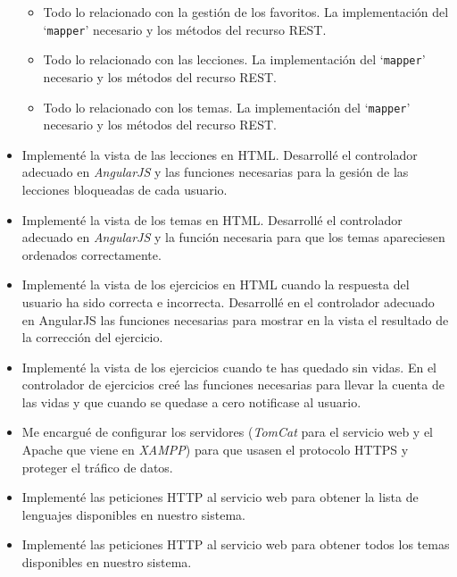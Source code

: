 \begin{itemize}
\begin{itemize}
\item
Todo lo relacionado con la gestión de los favoritos. La implementación del `\texttt{mapper}' necesario y los métodos del recurso REST.

\item
Todo lo relacionado con las lecciones. La implementación del `\texttt{mapper}' necesario y los métodos del recurso REST.

\item
Todo lo relacionado con los temas. La implementación del `\texttt{mapper}' necesario y los métodos del recurso REST.
\end{itemize}
    
\item
Implementé la vista de las lecciones en HTML. Desarrollé el controlador adecuado en \textit{AngularJS} y las funciones necesarias para la gesión de las lecciones bloqueadas de cada usuario.

\item
Implementé la vista de los temas en HTML. Desarrollé el controlador adecuado en \textit{AngularJS} y la función necesaria para que los temas apareciesen ordenados correctamente.

\item
Implementé la vista de los ejercicios en HTML cuando la respuesta del usuario ha sido correcta e incorrecta. Desarrollé en el controlador adecuado en AngularJS las funciones necesarias para mostrar en la vista el resultado de la corrección del ejercicio.

\item
Implementé la vista de los ejercicios cuando te has quedado sin vidas. En el controlador de ejercicios creé las funciones necesarias para llevar la cuenta de las vidas y que cuando se quedase a cero notificase al usuario.

\item
Me encargué de configurar los servidores (\textit{TomCat} para el servicio web y el Apache que viene en \textit{XAMPP}) para que usasen el protocolo HTTPS y proteger el tráfico de datos.

\item
Implementé las peticiones HTTP al servicio web para obtener la lista de lenguajes disponibles en nuestro sistema.

\item
Implementé las peticiones HTTP al servicio web para obtener todos los temas disponibles en nuestro sistema.


\end{itemize}
